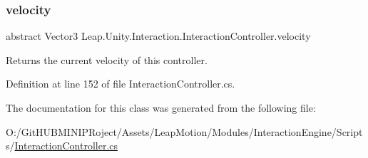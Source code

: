 \mbox{\label{class_leap_1_1_unity_1_1_interaction_1_1_interaction_controller_a33eaec5343487f2c11c8254c1e3b3d2f}} 
\subsubsection{\texorpdfstring{velocity}{velocity}}
{\footnotesize\ttfamily abstract Vector3 Leap.\+Unity.\+Interaction.\+Interaction\+Controller.\+velocity\hspace{0.3cm}{\ttfamily [get]}}



Returns the current velocity of this controller. 



Definition at line 152 of file Interaction\+Controller.\+cs.



The documentation for this class was generated from the following file\+:\begin{DoxyCompactItemize}
\item 
O\+:/\+Git\+H\+U\+B\+M\+I\+N\+I\+P\+Roject/\+Assets/\+Leap\+Motion/\+Modules/\+Interaction\+Engine/\+Scripts/\mbox{\hyperlink{_interaction_controller_8cs}{Interaction\+Controller.\+cs}}\end{DoxyCompactItemize}
